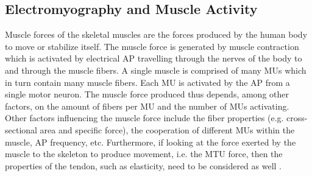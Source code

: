 \documentclass[../main.tex]{subfiles}
\begin{document}




\subsection{Electromyography and Muscle Activity}
\label{sec:A-EMG}
Muscle forces of the skeletal muscles are the forces produced by the human body to move or stabilize itself. 
The muscle force is generated by muscle contraction which is activated by electrical \ac{AP} travelling through the nerves of the body to and through the muscle fibers. 
A single muscle is comprised of many \acp{MU} which in turn contain many muscle fibers.
Each \ac{MU} is activated by the \ac{AP} from a single motor neuron.
The muscle force produced thus depends, among other factors, on the amount of fibers per \ac{MU} and the number of \acp{MU} activating.
Other factors influencing the muscle force include the fiber properties (e.g. cross-sectional area and specific force), the cooperation of different \acp{MU} within the muscle, \ac{AP} frequency, etc.
Furthermore, if looking at the force exerted by the muscle to the skeleton to produce movement, i.e. the \ac{MTU} force, then the properties of the tendon, such as elasticity, need to be considered as well \cite{Pizzolato2015, Enoka2016, Farina2016}. 
\end{document}
